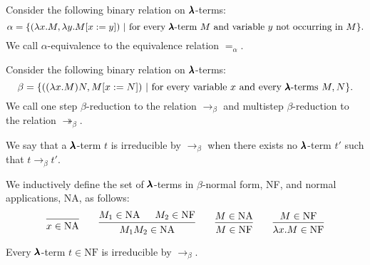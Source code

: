\begin{definition}
  Consider the following binary relation on $\pmb{\lambda}$-terms:  
  \[
    \alpha = \{ (\lambda x . M, \lambda y . M[x := y]) \
                | \ \text{for every $\pmb{\lambda}$-term $M$ and variable $y$ not occurring in $M$} \}.
  \]  
  We call $\alpha$-equivalence to the equivalence relation $=_\alpha$.
\end{definition}


\begin{definition}
  \label{beta-reduction}
  Consider the following binary relation on $\pmb{\lambda}$-terms:  
  \[
    \beta = \{ ((\lambda x . M) N, M[x := N]) \
                | \ \text{for every variable $x$ and every $\pmb{\lambda}$-terms $M, N$} \}.
  \]  
  We call one step $\beta$-reduction to the relation $\to_\beta$ and multistep $\beta$-reduction to the relation $\twoheadrightarrow_\beta$.
\end{definition}


\begin{definition}  
  We say that a $\pmb{\lambda}$-term $t$ is irreducible by $\to_\beta$ when there exists no $\pmb{\lambda}$-term $t'$ such that $t \to_\beta t'$.
\end{definition}


\begin{definition}
  \label{beta-nfs}
  We inductively define the set of $\pmb{\lambda}$-terms in $\beta$-normal form, NF, and normal applications, NA, as follows:
  \[
    \begin{prooftree}
      \infer0{ x \in \text{NA} } 
    \end{prooftree}
    \qquad
    \begin{prooftree}
      \hypo{ M_1 \in \text{NA} }
      \hypo{ M_2 \in \text{NF} }            
      \infer2{ M_1 M_2 \in \text{NA} } 
    \end{prooftree}
    \qquad
    \begin{prooftree}
      \hypo{ M \in \text{NA} }
      \infer1{ M \in \text{NF} } 
    \end{prooftree}
    \qquad
    \begin{prooftree}
      \hypo{ M \in \text{NF} }
      \infer1{ \lambda x . M \in \text{NF} } 
    \end{prooftree}
  \]
\end{definition}

\begin{claim}
  \label{beta_nfs_claim}
  Every $\pmb{\lambda}$-term $t \in \text{NF}$ is irreducible by $\to_\beta$.
\end{claim}


